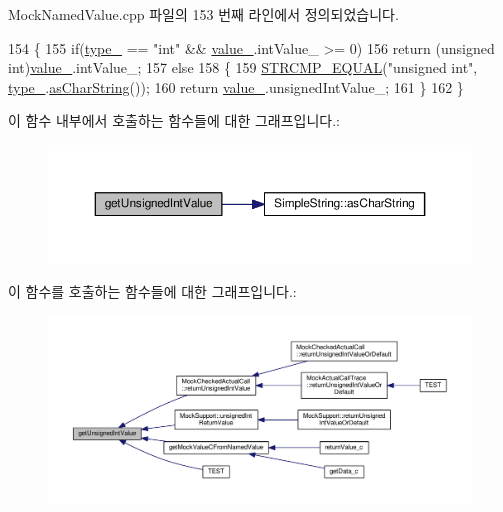 Mock\+Named\+Value.\+cpp 파일의 153 번째 라인에서 정의되었습니다.


\begin{DoxyCode}
154 \{
155     \textcolor{keywordflow}{if}(\hyperlink{class_mock_named_value_ad41f1c1c681fbfc6ba0ef62ac34ac075}{type\_} == \textcolor{stringliteral}{"int"} && \hyperlink{class_mock_named_value_a68986aee29946116b59c6189c19733ac}{value\_}.intValue\_ >= 0)
156         \textcolor{keywordflow}{return} (\textcolor{keywordtype}{unsigned} \textcolor{keywordtype}{int})\hyperlink{class_mock_named_value_a68986aee29946116b59c6189c19733ac}{value\_}.intValue\_;
157     \textcolor{keywordflow}{else}
158     \{
159         \hyperlink{_utest_macros_8h_ade1dda09c948fee9ceb853bc6dd5f3cb}{STRCMP\_EQUAL}(\textcolor{stringliteral}{"unsigned int"}, \hyperlink{class_mock_named_value_ad41f1c1c681fbfc6ba0ef62ac34ac075}{type\_}.\hyperlink{class_simple_string_af7c0efaf31f42553f05719903c830be1}{asCharString}());
160         \textcolor{keywordflow}{return} \hyperlink{class_mock_named_value_a68986aee29946116b59c6189c19733ac}{value\_}.unsignedIntValue\_;
161     \}
162 \}
\end{DoxyCode}


이 함수 내부에서 호출하는 함수들에 대한 그래프입니다.\+:
\nopagebreak
\begin{figure}[H]
\begin{center}
\leavevmode
\includegraphics[width=350pt]{class_mock_named_value_aee5bfac973d1da4fec61c285d0808258_cgraph}
\end{center}
\end{figure}




이 함수를 호출하는 함수들에 대한 그래프입니다.\+:
\nopagebreak
\begin{figure}[H]
\begin{center}
\leavevmode
\includegraphics[width=350pt]{class_mock_named_value_aee5bfac973d1da4fec61c285d0808258_icgraph}
\end{center}
\end{figure}


